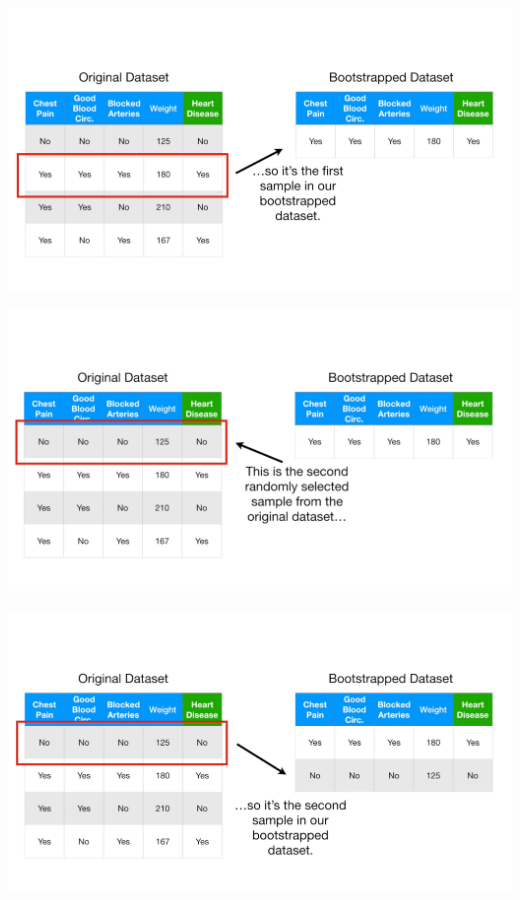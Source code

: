 \documentclass[
  ignorenonframetext,
]{beamer}
\begin{document}
\begin{frame}{}
\protect\hypertarget{section-14}{}
\includegraphics{images/r15.png}
\end{frame}

\begin{frame}{}
\protect\hypertarget{section-15}{}
\includegraphics{images/r16.png}
\end{frame}

\begin{frame}{}
\protect\hypertarget{section-16}{}
\includegraphics{images/r17.png}
\end{frame}
\end{document}

